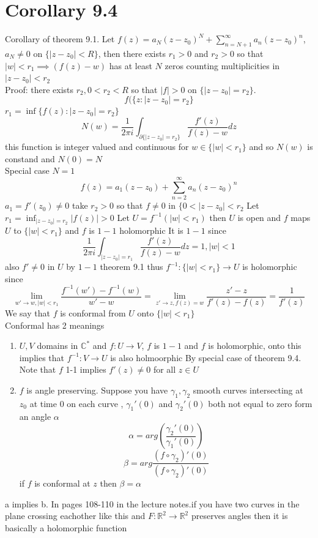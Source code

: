 \documentclass[11pt]{article}
\begin{document}
\section{Corollary 9.4}
Corollary of theorem 9.1.
Let $f(z) = a_N(z-z_0)^{N} + \sum_{n=N+1}^{\infty}a_n(z-z_0)^{n}$, $a_N \ne 0$  on $\{|z-z_0| < R\}$, then there exists $r_1 > 0$ and $r_2 > 0$ so that
$|w| < r_1 \implies (f(z)-w)$ has at least $N$ zeros counting multiplicities in  $|z-z_0| < r_2$\\
Proof: there exists $r_2, 0 < r_2 < R$ so that $|f| > 0$ on  $\{|z-z_0| = r_2\}$.
\[
    f(\{z : |z-z_0| = r_2\}
\] 
$r_1 = \inf\{f(z): |z-z_0| = r_2\}$
\[
N(w) =     \frac{1}{2\pi i} \int_{ \partial \{|z-z_0| = r_2\}}^{} \frac{f'(z)}{f(z)-w}dz
\] 
this function is integer valued and continuous for $w \in \{|w| < r_1\}$ and so $N(w)$ is constand and  $N(0) = N$  
\\
Special case $N = 1$
 \[
f(z) = a_1(z-z_0) + \sum_{n=2}^{\infty}a_n(z-z_{0})^{n}
\] 
$a_1 = f'(z_0) \ne 0$ take $r_2 > 0$ so that $f \ne 0$ in  $\{0 <|z-z_0| < r_2$ Let $r_1 = \inf_{|z-z_0| = r_2} |f(z)| > 0$
Let $U = f^{-1}(|w| < r_1)$ then $U$ is open and  $f$ maps  $U$ to  $\{|w| < r_1\}$ and $f$ is  $1-1$ holomorphic
It is  $1-1$ since
 \[
     \frac{1}{2\pi i} \int_{|z-z_0| = r_1}^{} \frac{f'(z)}{f(z) - w} dz = 1, |w| < 1
\] 
also $f' \ne 0$ in  $U$ by $1-1$ theorem 9.1
thus  $f^{-1}: \{|w| < r_1\} \rightarrow U $ is holomorphic since 
 \[
\lim_{w'\to w, |w| < r_1}  \frac{f^{-1}(w') - f^{-1}(w)}{w' -w} = \lim_{z'\to z, f(z) = w} \frac{z'-z}{f'(z) - f(z)} = \frac{1}{f'(z)}
\] 
We say that $f$ is conformal from $U$ onto  $\{|w| < r_1\}$\\
Conformal has 2 meanings
\begin{enumerate}
    \item $U, V$ domains in  $ \mathbb{C}^{*}$ and $f : U \rightarrow V$, $f$ is  $1-1$ and  $f$ is holomorphic, onto this implies that  $f^{-1} : V \rightarrow U$
        is also holmoorphic By special case of theorem 9.4. Note that $f$ 1-1 implies  $f'(z) \ne 0$ for all  $z \in U$
    \item $f$ is angle preserving. Suppose you have  $\gamma_1, \gamma_2$ smooth curves intersecting at $z_0$ at time $0$ on each curve
        , $\gamma_1'(0)$ and $\gamma_2'(0)$ both not equal to zero form an angle $\alpha$ 
        \[
        \alpha = arg(\frac{\gamma_2'(0)}{\gamma_1'(0)})
        \] 
        \[
        \beta = arg\frac{(f \circ \gamma_2)'(0)}{(f \circ \gamma_2)'(0)}
        \] 
        if $f$ is conformal at  $z$ then  $\beta = \alpha$
\end{enumerate}
a implies b. In pages 108-110 in the lecture notes.if you have two curves in the plane crossing eachother like this
and $F : \mathbb{R}^2 \rightarrow \mathbb{R}^2$ preserves angles then it is basically a holomorphic function
\end{document}
